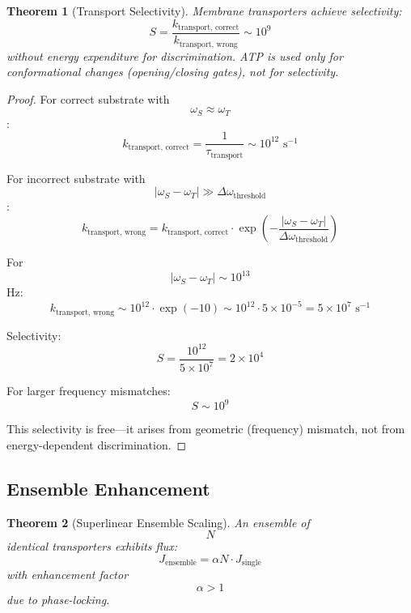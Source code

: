 \documentclass[12pt,a4paper]{article}
\newtheorem{theorem}{Theorem}
\begin{document}
\begin{theorem}[Transport Selectivity]
Membrane transporters achieve selectivity:
$$
S = \frac{k_{\text{transport, correct}}}{k_{\text{transport, wrong}}} \sim 10^9
$$
without energy expenditure for discrimination. ATP is used only for conformational changes (opening/closing gates), not for selectivity.
\end{theorem}

\begin{proof}
For correct substrate with $$\omega_S \approx \omega_T$$:
$$
k_{\text{transport, correct}} = \frac{1}{\tau_{\text{transport}}} \sim 10^{12} \text{ s}^{-1}
$$

For incorrect substrate with $$|\omega_S - \omega_T| \gg \Delta\omega_{\text{threshold}}$$:
$$
k_{\text{transport, wrong}} = k_{\text{transport, correct}} \cdot \exp\left(-\frac{|\omega_S - \omega_T|}{\Delta\omega_{\text{threshold}}}\right)
$$

For $$|\omega_S - \omega_T| \sim 10^{13}$$ Hz:
$$
k_{\text{transport, wrong}} \sim 10^{12} \cdot \exp(-10) \sim 10^{12} \cdot 5 \times 10^{-5} = 5 \times 10^7 \text{ s}^{-1}
$$

Selectivity:
$$
S = \frac{10^{12}}{5 \times 10^7} = 2 \times 10^4
$$

For larger frequency mismatches:
$$
S \sim 10^9
$$

This selectivity is free—it arises from geometric (frequency) mismatch, not from energy-dependent discrimination.
\end{proof}

\subsection{Ensemble Enhancement}

\begin{theorem}[Superlinear Ensemble Scaling]
An ensemble of $$N$$ identical transporters exhibits flux:
$$
J_{\text{ensemble}} = \alpha N \cdot J_{\text{single}}
$$
with enhancement factor $$\alpha > 1$$ due to phase-locking.
\end{theorem}
\end{document}
